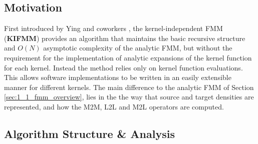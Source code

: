 \subsection{Motivation}

First introduced by Ying and coworkers \cite{Ying:2004:JCP}, the kernel-independent FMM (\textbf{\gls{KIFMM}})
provides an algorithm that maintains the basic recursive structure and $O(N)$
asymptotic complexity of the analytic FMM, but without the requirement for the
implementation of analytic expansions of the kernel function for each kernel.
Instead the method relies only on kernel function evaluations. This allows
software implementations to be written in an easily extensible manner for different
kernels. The main difference to the analytic FMM of Section \ref{sec:1_1_fmm_overview},
lies in the the way that source and target densities are represented, and how
the M2M, L2L and M2L operators are computed.

\subsection{Algorithm Structure \& Analysis}

